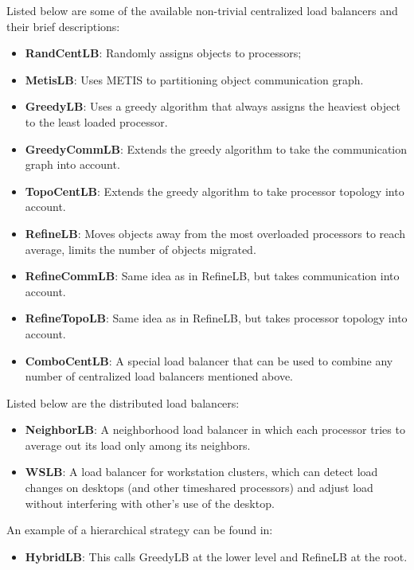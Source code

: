 Listed below are some of the available non-trivial centralized load balancers
and their brief descriptions:
\begin{itemize}
\item {\bf RandCentLB}:   Randomly assigns objects to processors;
\item {\bf MetisLB}:      Uses METIS\texttrademark\hspace{0mm} to partitioning object communication graph.
\item {\bf GreedyLB}:   Uses a greedy algorithm that always assigns the heaviest object to the least loaded processor.
\item {\bf GreedyCommLB}:  Extends the greedy algorithm to take the communication graph into account.
\item {\bf TopoCentLB}:    Extends the greedy algorithm to take processor topology into account.
\item {\bf RefineLB}:     Moves objects away from the most overloaded processors to reach average, limits the number of objects migrated.
\item {\bf RefineCommLB}:     Same idea as in RefineLB, but takes communication into account.
\item {\bf RefineTopoLB}:       Same idea as in RefineLB, but takes processor topology into account.
\item {\bf ComboCentLB}:  A special load balancer that can be used to combine any number of centralized load balancers mentioned above.
\end{itemize}

Listed below are the distributed load balancers:
\begin{itemize}
\item {\bf NeighborLB}:   A neighborhood load balancer in which each processor tries to average out its load only among its neighbors.
\item {\bf WSLB}:   A load balancer for workstation clusters, which can detect load changes on desktops (and other timeshared processors) and adjust load without interfering with other's use of the desktop.
\end{itemize}

An example of a hierarchical strategy can be found in:
\begin{itemize}
\item {\bf HybridLB}: This calls GreedyLB at the lower level and RefineLB at
the root.
\end{itemize}

